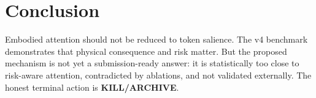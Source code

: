 \documentclass{article}
\begin{document}
\section{Conclusion}
Embodied attention should not be reduced to token salience. The v4 benchmark demonstrates that physical consequence and risk matter. But the proposed mechanism is not yet a submission-ready answer: it is statistically too close to risk-aware attention, contradicted by ablations, and not validated externally. The honest terminal action is \textbf{KILL/ARCHIVE}.
\end{document}
